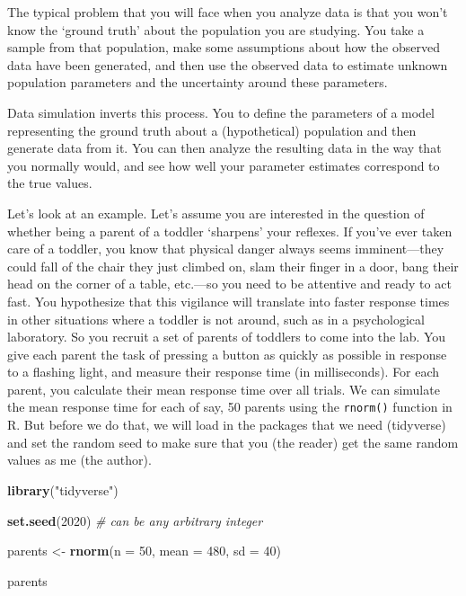 \documentclass[]{book}
\newenvironment{Shaded}{\begin{snugshade}}{\end{snugshade}}
\newcommand{\CommentTok}[1]{\textcolor[rgb]{0.56,0.35,0.01}{\textit{#1}}}
\newcommand{\DataTypeTok}[1]{\textcolor[rgb]{0.13,0.29,0.53}{#1}}
\newcommand{\DecValTok}[1]{\textcolor[rgb]{0.00,0.00,0.81}{#1}}
\newcommand{\KeywordTok}[1]{\textcolor[rgb]{0.13,0.29,0.53}{\textbf{#1}}}
\newcommand{\NormalTok}[1]{#1}
\newcommand{\StringTok}[1]{\textcolor[rgb]{0.31,0.60,0.02}{#1}}
\begin{document}
The typical problem that you will face when you analyze data is that you won't know the `ground truth' about the population you are studying. You take a sample from that population, make some assumptions about how the observed data have been generated, and then use the observed data to estimate unknown population parameters and the uncertainty around these parameters.

Data simulation inverts this process. You to define the parameters of a model representing the ground truth about a (hypothetical) population and then generate data from it. You can then analyze the resulting data in the way that you normally would, and see how well your parameter estimates correspond to the true values.

Let's look at an example. Let's assume you are interested in the question of whether being a parent of a toddler `sharpens' your reflexes. If you've ever taken care of a toddler, you know that physical danger always seems imminent---they could fall of the chair they just climbed on, slam their finger in a door, bang their head on the corner of a table, etc.---so you need to be attentive and ready to act fast. You hypothesize that this vigilance will translate into faster response times in other situations where a toddler is not around, such as in a psychological laboratory. So you recruit a set of parents of toddlers to come into the lab. You give each parent the task of pressing a button as quickly as possible in response to a flashing light, and measure their response time (in milliseconds). For each parent, you calculate their mean response time over all trials. We can simulate the mean response time for each of say, 50 parents using the \texttt{rnorm()} function in R. But before we do that, we will load in the packages that we need (tidyverse) and set the random seed to make sure that you (the reader) get the same random values as me (the author).

\begin{Shaded}
\begin{Highlighting}[]
\KeywordTok{library}\NormalTok{(}\StringTok{"tidyverse"}\NormalTok{)}

\KeywordTok{set.seed}\NormalTok{(}\DecValTok{2020}\NormalTok{)  }\CommentTok{# can be any arbitrary integer}
\end{Highlighting}
\end{Shaded}

\begin{Shaded}
\begin{Highlighting}[]
\NormalTok{parents <-}\StringTok{ }\KeywordTok{rnorm}\NormalTok{(}\DataTypeTok{n =} \DecValTok{50}\NormalTok{, }\DataTypeTok{mean =} \DecValTok{480}\NormalTok{, }\DataTypeTok{sd =} \DecValTok{40}\NormalTok{)}

\NormalTok{parents}
\end{Highlighting}
\end{Shaded}
\end{document}
